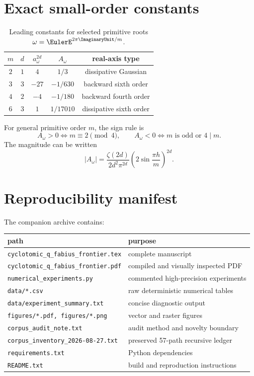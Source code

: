 \documentclass[11pt]{article}
\theoremstyle{definition}
\begin{document}
\section{Exact small-order constants}

\begin{table}[H]
\centering
\caption{Leading constants for selected primitive roots $\omega=\EulerE^{2\pi\ImaginaryUnit/m}$.}
\begin{tabular}{@{}ccccc@{}}
\toprule
$m$ & $d$ & $a_\omega^{2d}$ & $A_\omega$ & real-axis type\\
\midrule
$2$ & $1$ & $4$ & $1/3$ & dissipative Gaussian\\
$3$ & $3$ & $-27$ & $-1/630$ & backward sixth order\\
$4$ & $2$ & $-4$ & $-1/180$ & backward fourth order\\
$6$ & $3$ & $1$ & $1/17010$ & dissipative sixth order\\
\bottomrule
\end{tabular}
\end{table}

For general primitive order $m$, the sign rule is
\[
 A_\omega>0\iff m\equiv2\pmod4,
 \qquad
 A_\omega<0\iff m\text{ is odd or }4\mid m.
\]
The magnitude can be written
\begin{equation}
 |A_\omega|
 =\frac{\zeta(2d)}{2d^2\pi^{2d}}
 \left(2\sin\frac{\pi h}{m}\right)^{2d}.
 \label{eq:A-magnitude}
\end{equation}

\section{Reproducibility manifest}

The companion archive contains:
\begin{center}
\begin{tabularx}{0.96\textwidth}{@{}p{}X@{}}
\toprule
path & purpose\\
\midrule
\texttt{cyclotomic\_q\_fabius\_frontier.tex} & complete manuscript\\
\texttt{cyclotomic\_q\_fabius\_frontier.pdf} & compiled and visually inspected PDF\\
\texttt{numerical\_experiments.py} & commented high-precision experiments\\
\texttt{data/*.csv} & raw deterministic numerical tables\\
\texttt{data/experiment\_summary.txt} & concise diagnostic output\\
\texttt{figures/*.pdf, figures/*.png} & vector and raster figures\\
\texttt{corpus\_audit\_note.txt} & audit method and novelty boundary\\
\texttt{corpus\_inventory\_2026-08-27.txt} & preserved 57-path recursive ledger\\
\texttt{requirements.txt} & Python dependencies\\
\texttt{README.txt} & build and reproduction instructions\\
\bottomrule
\end{tabularx}
\end{center}
\end{document}
